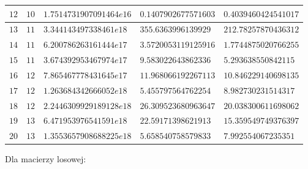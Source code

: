 \documentclass{article}
\begin{document}
\begin{center}
\begin{tabular}{|p{1cm}|p{1cm}|p{4cm}|p{4cm}|p{4cm}|}
		\hline
		$12$ & $10$ & $1.7514731907091464e16$ & $0.1407902677571603$ & $0.4039460424541017$  \\
		\hline
		$13$ & $11$ & $3.344143497338461e18$ & $355.6363996139929$ & $212.78257870436312$  \\
		\hline
		$14$ & $11$ & $6.200786263161444e17$ & $3.5720053119125916$ & $1.7744875020766255$  \\
		\hline
		$15$ & $11$ & $3.674392953467974e17$ & $9.583022643862336$ & $5.293638550842115$  \\
		\hline
		$16$ & $12$ & $7.865467778431645e17$ & $11.968066192267113$ & $10.846229140698135$  \\
		\hline
		$17$ & $12$ & $1.263684342666052e18$ & $5.455797564762254$ & $8.982730231514317$  \\
		\hline
		$18$ & $12$ & $2.2446309929189128e18$ & $26.309523680963647$ & $20.038300611698062$  \\
		\hline
		$19$ & $13$ & $6.471953976541591e18$ & $22.59171398621913$ & $15.359549749376397$  \\
		\hline
		$20$ & $13$ & $1.3553657908688225e18$ & $5.658540758579833$ & $7.992554067235351$  \\
		\hline
	\end{tabular}
\end{center}
Dla macierzy losowej:
\end{document}
